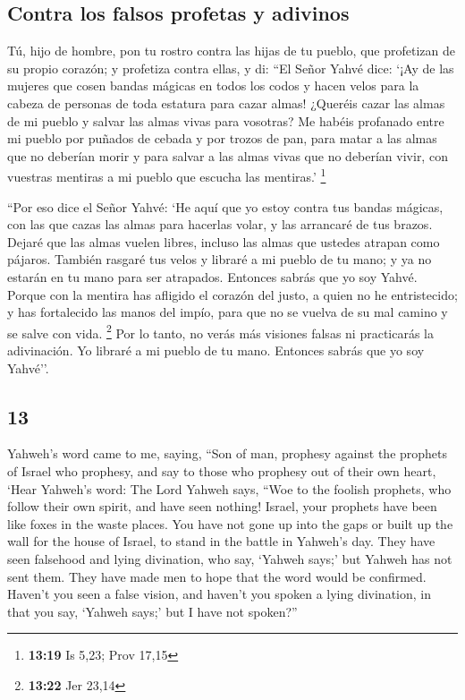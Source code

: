 \begin{paracol}{2}
\hypertarget{contra-los-falsos-profetas-y-adivinos}{%
\subsection{Contra los falsos profetas y
adivinos}\label{contra-los-falsos-profetas-y-adivinos}}

 Tú, hijo de hombre, pon tu rostro contra las hijas de tu
pueblo, que profetizan de su propio corazón; y profetiza contra ellas,
 y di: ``El Señor Yahvé dice: `¡Ay de las mujeres que
cosen bandas mágicas en todos los codos y hacen velos para la cabeza de
personas de toda estatura para cazar almas! ¿Queréis cazar las almas de
mi pueblo y salvar las almas vivas para vosotras?  Me
habéis profanado entre mi pueblo por puñados de cebada y por trozos de
pan, para matar a las almas que no deberían morir y para salvar a las
almas vivas que no deberían vivir, con vuestras mentiras a mi pueblo que
escucha las mentiras.' \footnote{\textbf{13:19} Is 5,23; Prov 17,15}

 ``Por eso dice el Señor Yahvé: `He aquí que yo estoy
contra tus bandas mágicas, con las que cazas las almas para hacerlas
volar, y las arrancaré de tus brazos. Dejaré que las almas vuelen
libres, incluso las almas que ustedes atrapan como pájaros.
 También rasgaré tus velos y libraré a mi pueblo de tu
mano; y ya no estarán en tu mano para ser atrapados. Entonces sabrás que
yo soy Yahvé.  Porque con la mentira has afligido el
corazón del justo, a quien no he entristecido; y has fortalecido las
manos del impío, para que no se vuelva de su mal camino y se salve con
vida. \footnote{\textbf{13:22} Jer 23,14}  Por lo tanto,
no verás más visiones falsas ni practicarás la adivinación. Yo libraré a
mi pueblo de tu mano. Entonces sabrás que yo soy Yahvé''.

\switchcolumn
\begin{otherlanguage}{english}

\hypertarget{section-25}{%
\section{13}\label{section-25}}

 Yahweh's word came to me, saying,  ``Son of
man, prophesy against the prophets of Israel who prophesy, and say to
those who prophesy out of their own heart, `Hear Yahweh's word:
 The Lord Yahweh says, ``Woe to the foolish prophets, who
follow their own spirit, and have seen nothing!  Israel,
your prophets have been like foxes in the waste places. 
You have not gone up into the gaps or built up the wall for the house of
Israel, to stand in the battle in Yahweh's day.  They have
seen falsehood and lying divination, who say, `Yahweh says;' but Yahweh
has not sent them. They have made men to hope that the word would be
confirmed.  Haven't you seen a false vision, and haven't
you spoken a lying divination, in that you say, `Yahweh says;' but I
have not spoken?''


\end{otherlanguage}
\end{paracol}
